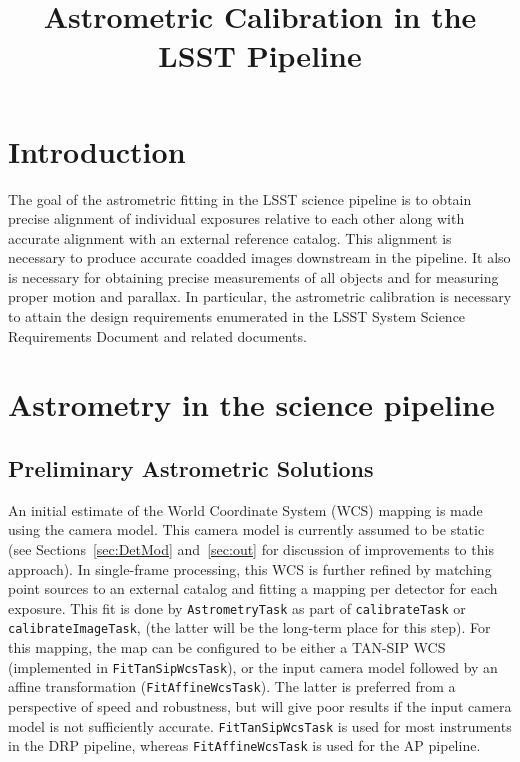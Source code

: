 \documentclass[DM,authoryear,toc]{lsstdoc}
\title{Astrometric Calibration in the LSST Pipeline}
\date{\vcsDate}
\begin{document}
\maketitle

\section{Introduction}
The goal of the astrometric fitting in the LSST science pipeline  is to obtain precise alignment of individual exposures relative to each other along with accurate alignment with an external reference catalog. This alignment is necessary to produce accurate coadded images downstream in the pipeline. It also is necessary for obtaining precise measurements of all objects and for measuring proper motion and parallax. In particular, the astrometric calibration is necessary to attain the design requirements enumerated in the LSST System Science Requirements Document  and related documents.

\section{Astrometry in the science pipeline}
\subsection{Preliminary Astrometric Solutions}
An initial estimate of the World Coordinate System (WCS) mapping is made using the camera model. This camera model is currently assumed to be static (see Sections~\ref{sec:DetMod} and~\ref{sec:out} for discussion of improvements to this approach). In single-frame processing, this WCS is further refined by matching point sources to an external catalog and fitting a mapping per detector for each exposure. This fit is done by \texttt{AstrometryTask} as part of \texttt{calibrateTask} or \texttt{calibrateImageTask}, (the latter will be the long-term place for this step). For this mapping, the map can be configured to be either a TAN-SIP WCS \citep{2005ASPC..347..491S} (implemented in \texttt{FitTanSipWcsTask}), or the input camera model followed by an affine transformation (\texttt{FitAffineWcsTask}). The latter is preferred from a perspective of speed and robustness, but will give poor results if the input camera model is not sufficiently accurate. \texttt{FitTanSipWcsTask} is used for most instruments in the DRP pipeline, whereas \texttt{FitAffineWcsTask} is used for the AP pipeline.
\end{document}
